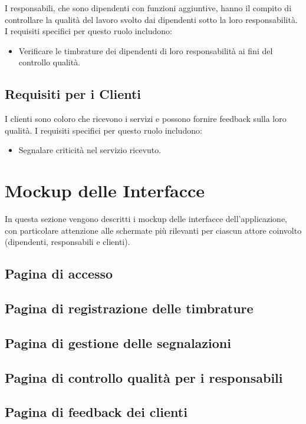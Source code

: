 \documentclass[twoside]{supsistudent}
\begin{document}
I responsabili, che sono dipendenti con funzioni aggiuntive, hanno il compito di controllare la qualità del lavoro svolto dai dipendenti sotto la loro responsabilità. I requisiti specifici per questo ruolo includono:

\begin{itemize}
  \item Verificare le timbrature dei dipendenti di loro responsabilità ai fini del controllo qualità.
\end{itemize}

\subsection{Requisiti per i Clienti}

I clienti sono coloro che ricevono i servizi e possono fornire feedback sulla loro qualità. I requisiti specifici per questo ruolo includono:

\begin{itemize}
  \item Segnalare criticità nel servizio ricevuto.
\end{itemize}


\section{Mockup delle Interfacce}

In questa sezione vengono descritti i mockup delle interfacce dell’applicazione, con particolare attenzione alle schermate più rilevanti per ciascun attore coinvolto (dipendenti, responsabili e clienti).

\subsection{Pagina di accesso}
\subsection{Pagina di registrazione delle timbrature}
\subsection{Pagina di gestione delle segnalazioni}
\subsection{Pagina di controllo qualità per i responsabili}
\subsection{Pagina di feedback dei clienti}
\end{document}
